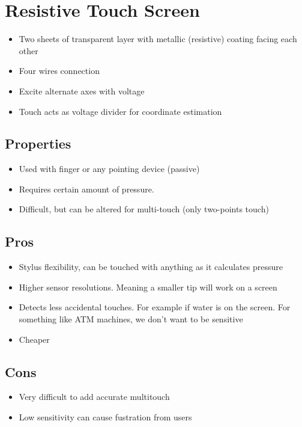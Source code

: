 \documentclass{article}
\begin{document}
\section{Resistive Touch Screen}

\begin{itemize}
  \item Two sheets of transparent layer with metallic (resistive) coating facing each other
  \item Four wires connection
  \item Excite alternate axes with voltage
  \item Touch acts as voltage divider for coordinate estimation
\end{itemize}

\subsection{Properties}

\begin{itemize}
  \item Used with finger or any pointing device (passive)
  \item Requires certain amount of pressure.
  \item Difficult, but can be altered for multi-touch (only two-points touch)
\end{itemize}

\subsection{Pros}
\begin{itemize}
  \item Stylus flexibility, can be touched with anything as it calculates pressure
  \item Higher sensor resolutions. Meaning a smaller tip will work on a screen
  \item Detects less accidental touches. For example if water is on the screen. For something like ATM machines, we don't want to be sensitive
  \item Cheaper
\end{itemize}

\subsection{Cons}
\begin{itemize}
  \item Very difficult to add accurate multitouch
  \item Low sensitivity can cause fustration from users
\end{itemize}
\end{document}
